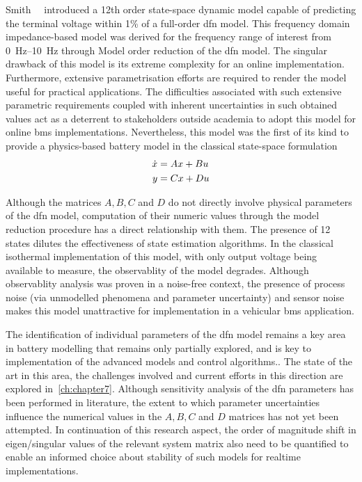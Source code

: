 Smith~\etal{}~\cite{Smith2007} introduced a 12th order state-space dynamic model capable of
predicting the terminal voltage within 1\% of a full-order \gls{dfn} model. This frequency domain
impedance-based model was derived for the frequency range of interest from \SIrange{0}{10}{\hertz}
through Model order reduction of the \gls{dfn} model. The singular drawback of this model is its
extreme complexity for an online implementation. Furthermore, extensive parametrisation efforts are
required  to render
the model useful for practical applications. The difficulties associated with such extensive
parametric requirements coupled with inherent uncertainties in such obtained values act as a
deterrent to stakeholders outside academia to adopt this model for online \gls{bms} implementations.
Nevertheless, this model was the first of its kind to provide a physics-based battery model in the
classical state-space formulation
\begin{align}
    \dot{x} &= Ax + Bu \\\notag
    y &= Cx + Du
\end{align}

Although the matrices $A, B, C$ and $D$ do not directly involve physical parameters of the
\gls{dfn} model, computation of their numeric values through the model reduction procedure has a
direct relationship with them. The presence of 12 states dilutes the effectiveness of state
estimation algorithms. In the classical isothermal implementation of this model, with only output
voltage being available to measure, the observablity of the model degrades. Although observablity
analysis was proven in a noise-free context, the presence of process noise (via unmodelled phenomena
and parameter uncertainty) and sensor noise makes this model unattractive for implementation in a
vehicular \gls{bms} application.

The identification of individual parameters of the \gls{dfn} model remains a key area in battery
modelling that remains only partially explored, and is key to implementation of the advanced models
and control algorithms.. The state of the
art in this area, the challenges involved and current efforts in this direction are explored
in~\cref{ch:chapter7}. Although sensitivity analysis of the \gls{dfn} parameters has been performed
in literature,  the extent to which parameter uncertainties influence the
numerical values in the $A, B, C$ and $D$ matrices has not yet been attempted. In continuation of
this research aspect, the order of magnitude shift in eigen/singular values of the relevant system
matrix also need to be quantified to enable an informed choice about stability of such models for
realtime implementations.

